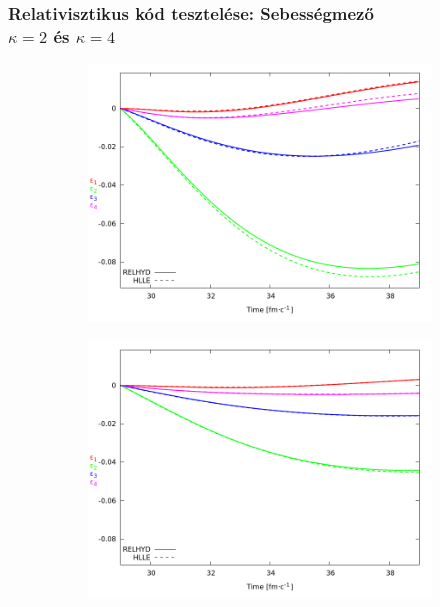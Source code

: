 \documentclass{beamer}
\begin{document}
\begin{frame}
\frametitle{Relativisztikus kód tesztelése: Sebességmező \\ $\kappa=2$ és $\kappa=4$}
\begin{center}
\begin{figure}[H]
	\centering
    \begin{subfigure}[b]{0.49\textwidth}
    		\includegraphics[width=\textwidth]{pic/res/hr_v_kappa=2}
	\end{subfigure}
	\begin{subfigure}[b]{0.49\textwidth}
        	\includegraphics[width=\textwidth]{pic/res/hr_v_kappa=4}
	\end{subfigure}
\end{figure}
\end{center}
\end{frame}
\end{document}
